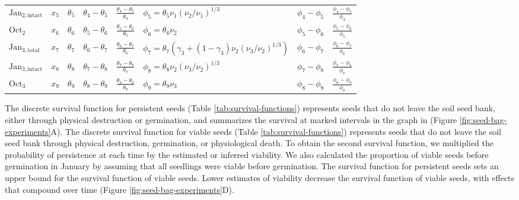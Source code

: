 \documentclass[12pt, oneside, titlepage]{article}   	%
\begin{document}
\begin{center}
\begin{tabularx}{\linewidth}{l c | l l l | l l l   }
  $\mathrm{Jan_{2,intact}}$ & $x_5$ & $\theta_5$ & $\theta_4-\theta_5$ & $\frac{\theta_4-\theta_5}{\theta_4}$  & $\phi_5 = \theta_5 \nu_1 (\nu_2 / \nu_1)^{1/3}$ & $\phi_4 - \phi_5$  &  $\frac{\phi_4-\phi_5}{\phi_4}$ \\
 
   $\mathrm{Oct}_2$ & $x_6$ &  $\theta_6$  & $\theta_5-\theta_6$ & $\frac{\theta_5-\theta_6}{\theta_5}$ & $\phi_6 = \theta_6  \nu_2 $ & $\phi_5 - \phi_6$  & $\frac{\phi_5-\phi_6}{\phi_5}$  \\
   
  $\mathrm{Jan_{3,total}}$ & $x_{7}$ & $\theta_{7}$  & $\theta_6-\theta_7$ & $\frac{\theta_6-\theta_7}{\theta_6}$ & $\phi_7 = \theta_7 (\gamma_3 + (1-\gamma_3) \nu_2 (\nu_3 / \nu_2 )^{1/3})   $ & $\phi_6 - \phi_7$  & $\frac{\phi_6-\phi_7}{\phi_6}$   \\

  $\mathrm{Jan_{3,intact}}$ & $x_{8}$ & $\theta_{8}$ & $\theta_7-\theta_8$ & $\frac{\theta_7-\theta_8}{\theta_7}$  & $\phi_8 = \theta_8 \nu_2 (\nu_3 / \nu_2 )^{1/3}$ & $\phi_7 - \phi_8$  & $\frac{\phi_7-\phi_8}{\phi_7}$  \\
 
   $\mathrm{Oct}_3$ & $x_{9}$ &  $\theta_{9}$ & $\theta_8-\theta_9$  & $\frac{\theta_8-\theta_9}{\theta_8}$ & $\phi_9 = \theta_9 \nu_3$ & $\phi_8 - \phi_9$  & $\frac{\phi_8-\phi_9}{\phi_8}$ \\
 
  \hline
\end{tabularx}
\end{center}
%
\doublespace

The discrete survival function for persistent seeds (Table \ref{tab:survival-functions}) represents seeds that do not leave the soil seed bank, either through physical destruction or germination, and summarizes the survival at marked intervals in the graph in (Figure \ref{fig:seed-bag-experiments}A). The discrete survival function for viable seeds (Table \ref{tab:survival-functions}) represents seeds that do not leave the soil seed bank through physical destruction, germination, or physiological death. To obtain the second survival function, we multiplied the probability of persistence at each time by the estimated or inferred viability. We also calculated the proportion of viable seeds before germination in January by assuming that all seedlings were viable before germination. The survival function for persistent seeds sets an upper bound for the survival function of viable seeds. Lower estimates of viability decrease the survival function of viable seeds, with effects that compound over time (Figure \ref{fig:seed-bag-experiments}D). 
\end{document}
